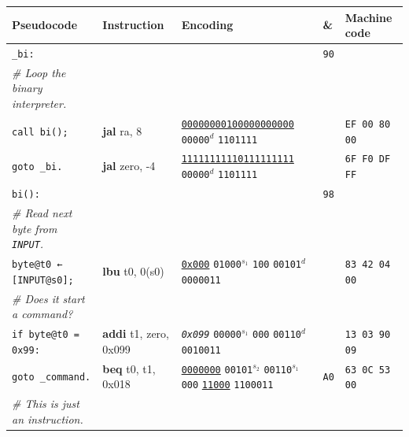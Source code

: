 \documentclass[a4paper,12pt,final]{article}
\begin{document}
\begin{table}[!htbp] \begin{adjustwidth}{-1cm}{-1cm} \fontsize{8}{9.600000}\selectfont
\begin{center}
\begin{tabular}{l|ll|l|l}
\textbf{Pseudocode} & \textbf{Instruction} & \textbf{Encoding} & \textbf{\&} & \textbf{Machine code}\\[0pt]
\hline
\texttt{\_bi:} &  &  & \texttt{90} & \\[0pt]
\hspace{1em} \emph{\# Loop the binary interpreter.} &  &  &  & \\[0pt]
\hspace{1em} \texttt{call bi();} & \textbf{jal} ra, 8 & \uline{\texttt{00000000100000000000}}                                     \texttt{00000}​\(^{d}\)  \texttt{1101111} &  & \texttt{EF 00 80 00}\\[0pt]
\hspace{1em} \texttt{goto \_bi.} & \textbf{jal} zero, -4 & \uline{\texttt{11111111110111111111}}                                     \texttt{00000}​\(^{d}\)  \texttt{1101111} &  & \texttt{6F F0 DF FF}\\[0pt]
\texttt{bi():} &  &  & \texttt{98} & \\[0pt]
\hspace{1em} \emph{\# Read next byte from \texttt{INPUT}.} &  &  &  & \\[0pt]
\hspace{1em} \texttt{byte@t0 ← [INPUT@s0];} & \textbf{lbu} t0, 0(s0) & \uline{\texttt{0x000}}                    \texttt{01000}​\(^{s_{1}}\) \texttt{100} \texttt{00101}​\(^{d}\)  \texttt{0000011} &  & \texttt{83 42 04 00}\\[0pt]
\hspace{1em} \emph{\# Does it start a command?} &  &  &  & \\[0pt]
\hspace{1em} \texttt{if byte@t0 = 0x99:} & \textbf{addi} t1, zero, 0x099 & \emph{\texttt{0x099}}                    \texttt{00000}​\(^{s_{1}}\) \texttt{000} \texttt{00110}​\(^{d}\)  \texttt{0010011} &  & \texttt{13 03 90 09}\\[0pt]
\hspace{2em}     \texttt{goto \_command.} & \textbf{beq} t0, t1, 0x018 & \uline{\texttt{0000000}} \texttt{00101}​\(^{s_{2}}\) \texttt{00110}​\(^{s_{1}}\) \texttt{000} \uline{\texttt{11000}} \texttt{1100011} & \texttt{A0} & \texttt{63 0C 53 00}\\[0pt]
\hspace{1em} \emph{\# This is just an instruction.} &  &  &  & \\[0pt]

\end{tabular}
\end{center}
\end{adjustwidth}
\end{table}
\end{document}
